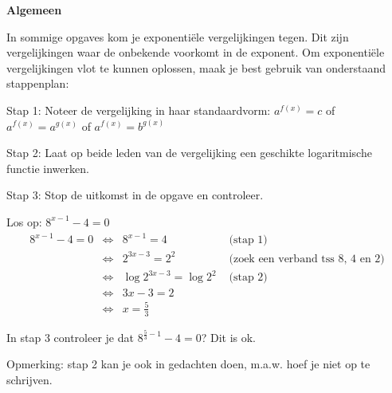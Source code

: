 \textbf{Algemeen}

In sommige opgaves kom je exponenti\"ele vergelijkingen tegen. Dit zijn
vergelijkingen waar de onbekende voorkomt in de exponent. Om exponenti\"ele
vergelijkingen vlot te kunnen oplossen, maak je best gebruik van onderstaand
stappenplan:

Stap 1: Noteer de vergelijking in haar standaardvorm: $ a^{f(x)}=c$
of $ a^{f(x)}=a^{g(x)}$ of $ a^{f(x)}=b^{g(x)}$ 

Stap 2: Laat op beide leden van de vergelijking een geschikte logaritmische
functie inwerken.

Stap 3: Stop de uitkomst in de opgave en controleer.

\begin{voorbeeld}

Los op: $8^{x-1}-4=0$
\begin{equation*}
 \begin{array}{rclr}
 8^{x-1}-4=0 &
	\iff & 8^{x-1} = 4 & \text{ (stap 1)}\\
	& \iff & 2^{3x-3} = 2^{2} & \text{ (zoek een verband tss 8, 4 en 2)}\\
	& \iff & \log2^{3x-3} = \log2^{2} & \text{ (stap 2)}\\
	& \iff & 3x-3 = 2 & \text{}\\
	& \iff & x = \frac{5}{3}
	\end{array}
\end{equation*}

In stap 3 controleer je dat $ 8^{\frac{5}{3}-1}-4=0$?
Dit is ok.

Opmerking: stap 2 kan je ook in gedachten doen, m.a.w. hoef je niet
op te schrijven.

\end{voorbeeld}
